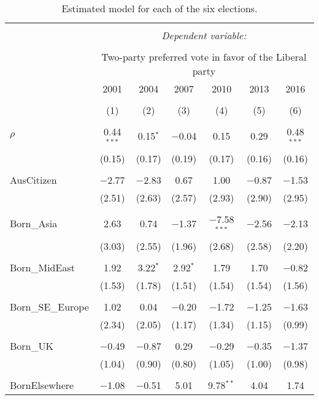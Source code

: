 \documentclass[openany]{book}
\begin{document}
\begin{table}[!htbp] \centering 
  \caption{Estimated model for each of the six elections.} 
  \label{} 
\tiny 
\begin{tabular}{@{\extracolsep{1pt}}lcccccc} 
\\[-1.8ex]\hline 
\hline \\[-1.8ex] 
 & \multicolumn{6}{c}{\textit{Dependent variable:}} \\ 
\cline{2-7} 
\\[-1.8ex] & \multicolumn{6}{c}{Two-party preferred vote in favor of the Liberal party} \\ 
 & 2001 & 2004 & 2007 & 2010 & 2013 & 2016 \\ 
\\[-1.8ex] & (1) & (2) & (3) & (4) & (5) & (6)\\ 
\hline \\[-1.8ex] 
 $\rho$ & 0.44$^{***}$ & 0.15$^{*}$ & $-$0.04 & 0.15 & 0.29 & 0.48$^{***}$ \\ 
  & (0.15) & (0.17) & (0.19) & (0.17) & (0.16) & (0.16) \\ 
  & & & & & & \\ 
 AusCitizen & $-$2.77 & $-$2.83 & 0.67 & 1.00 & $-$0.87 & $-$1.53 \\ 
  & (2.51) & (2.63) & (2.57) & (2.93) & (2.90) & (2.95) \\ 
  & & & & & & \\ 
 Born\_Asia & 2.63 & 0.74 & $-$1.37 & $-$7.58$^{***}$ & $-$2.56 & $-$2.13 \\ 
  & (3.03) & (2.55) & (1.96) & (2.68) & (2.58) & (2.20) \\ 
  & & & & & & \\ 
 Born\_MidEast & 1.92 & 3.22$^{*}$ & 2.92$^{*}$ & 1.79 & 1.70 & $-$0.82 \\ 
  & (1.53) & (1.78) & (1.51) & (1.54) & (1.54) & (1.56) \\ 
  & & & & & & \\ 
 Born\_SE\_Europe & 1.02 & 0.04 & $-$0.20 & $-$1.72 & $-$1.25 & $-$1.63 \\ 
  & (2.34) & (2.05) & (1.17) & (1.34) & (1.15) & (0.99) \\ 
  & & & & & & \\ 
 Born\_UK & $-$0.49 & $-$0.87 & 0.29 & $-$0.29 & $-$0.35 & $-$1.37 \\ 
  & (1.04) & (0.90) & (0.80) & (1.05) & (1.00) & (0.98) \\ 
  & & & & & & \\ 
 BornElsewhere & $-$1.08 & $-$0.51 & 5.01 & 9.78$^{**}$ & 4.04 & 1.74 \\ 

\end{tabular}
\end{table}
\end{document}
